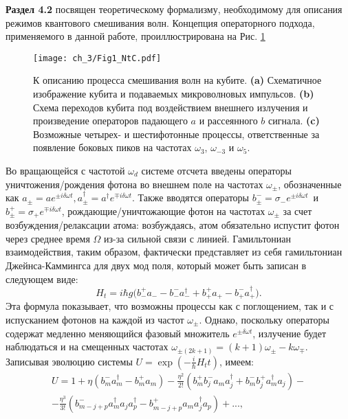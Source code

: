 \textbf{Раздел 4.2} посвящен теоретическому формализму, необходимому для описания режимов квантового смешивания волн. Концепция операторного подхода, применяемого в данной работе, проиллюстрирована на Рис. \ref{fig: opers}
\begin{figure}[htb]\center
	\texttt{[image: ch\_3/Fig1\_NtC.pdf]}
	\caption{К описанию процесса смешивания волн на кубите. \textbf{(a)} Схематичное изображение кубита и подаваемых микроволновых импульсов. \textbf{(b)} Схема переходов кубита под воздействием внешнего излучения и произведение операторов падающего $a$ и рассеянного $b$ сигнала. \textbf{(c)} Возможные четырех- и шестифотонные процессы, ответственные за появление боковых пиков на частотах $\omega_3$, $\omega_{-3}$ и $\omega_5$. }
	\label{fig: opers}	
\end{figure}
Во вращающейся с частотой $\omega_d$ системе отсчета введены операторы уничтожения/рождения фотона во внешнем поле на частотах $\omega_{\pm}$, обозначенные как $a_{\pm}=ae^{\pm i\delta\omega t}, a^{\dag}_{\pm} = a^{\dag}e^{\mp i\delta\omega t}$. Также вводятся операторы $b^-_{\pm}=\sigma_-e^{\pm i\delta\omega t}$~и~$b^+_{\pm}=\sigma_+ e^{\mp i\delta\omega t}$, рождающие/уничтожающие фотон на частотах $\omega_{\pm}$ за счет возбуждения/релаксации атома: возбуждаясь, атом обязательно испустит фотон через среднее время $\Omega$ из-за сильной связи с линией. Гамильтониан взаимодействия, таким образом, фактически представляет из себя гамильтониан Джейнса-Каммингса для двух мод поля, который  может быть записан в следующем виде:
\begin{equation}
H_t = i \hbar g\big(b_-^+ a_{-}  - b_-^-a^\dag_{-} + b_+^+ a_{+} - b^-_+ a^\dag_{+} \big).
\label{Hmb}
\end{equation}
Эта формула показывает, что возможны процессы как с поглощением, так и с испусканием фотонов на каждой из частот $\omega_{\pm}$. Однако, поскольку операторы содержат медленно меняющийся фазовый множитель $e^{\pm\delta\omega t}$, излучение будет наблюдаться и на смещенных частотах $\omega_{\pm(2k+1)} = (k+1)\omega_{\pm} - k\omega_{\mp}$. Записывая эволюцию системы $U = \exp(-\frac{i}{\hbar}H_t t)$, имеем:
\begin{equation}
\begin{split}
U =1 + \eta (b^-_m a^\dag_m - b^+_m a_m)  - \frac{\eta^2}{2!}(b^+_m b^-_j a_m a^\dag_j + b^-_m b^+_j a_m^{\dag} a_j)
- \\ - \frac{\eta^3}{3!} (b^-_{m-j+p} a^\dag_m a_j a^\dag_p - b^+_{m-j+p} a_m a_j^{\dag} a_p) +...,
\end{split}
\label{eq:ut2}
\end{equation}
